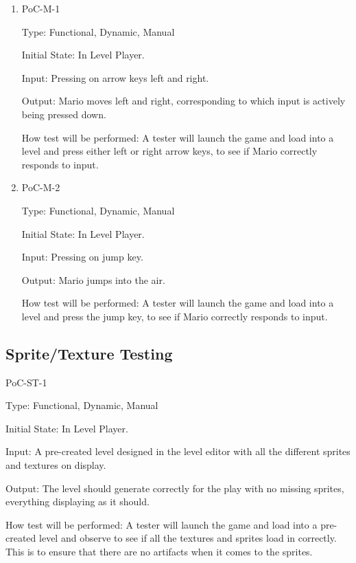 \documentclass[12pt, titlepage]{article}
\begin{document}
\begin{enumerate}

\item{PoC-M-1\\}

Type: Functional, Dynamic, Manual
					
Initial State: In Level Player.
					
Input: Pressing on arrow keys left and right.
					
Output: Mario moves left and right, corresponding to which input is actively being pressed down.
					
How test will be performed: A tester will launch the game and load into a level and press either left or right arrow keys, to see if Mario correctly responds to input.

\item{PoC-M-2\\}

Type: Functional, Dynamic, Manual
					
Initial State: In Level Player.
					
Input: Pressing on jump key.
					
Output: Mario jumps into the air.
					
How test will be performed: A tester will launch the game and load into a level and press the jump key, to see if Mario correctly responds to input.
\end{enumerate}

\subsection{Sprite/Texture Testing}

\item{PoC-ST-1\\}

Type: Functional, Dynamic, Manual
					
Initial State: In Level Player.
					
Input: A pre-created level designed in the level editor with all the different sprites and textures on display.
					
Output: The level should generate correctly for the play with no missing sprites, everything displaying as it should.
					
How test will be performed: A tester will launch the game and load into a pre-created level and observe to see if all the textures and sprites load in correctly. This is to ensure that there are no artifacts when it comes to the sprites.
\end{document}
